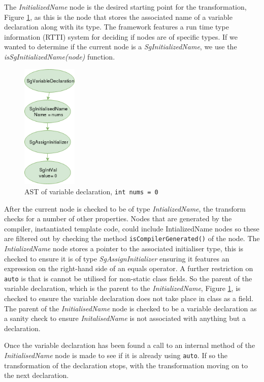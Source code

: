 \documentclass[bsc,frontabs,singlespacing,twoside,parskip,deptreport]{infthesis}
\begin{document}
The \textit{InitializedName} node is the desired starting point for the transformation, Figure \ref{fig:var-dec-ast}, as this is the node that stores the associated name of a variable declaration along with its type. The framework features a run time type information (RTTI) system for deciding if nodes are of specific types. If we wanted to determine if the current node is a \textit{SgInitializedName}, we use the \textit{isSgInitializedName(node)} function.

\begin{figure}[H]
    \centering
    \includegraphics[height=6cm]{images/ast-var-dec.png}
    \caption{AST of variable declaration, \texttt{int nums = 0}}
    \label{fig:var-dec-ast}
\end{figure}

After the current node is checked to be of type \textit{IntializedName}, the transform checks for a number of other properties. Nodes that are generated by the compiler, instantiated template code, could include IntializedName nodes so these are filtered out by checking the method \texttt{isCompilerGenerated()} of the node. The \textit{IntializedName} node stores a pointer to the associated initialiser type, this is checked to ensure it is of type \textit{SgAssignInitializer} ensuring it features an expression on the right-hand side of an equals operator. A further restriction on \texttt{auto} is that is cannot be utilised for non-static class fields. So the parent of the variable declaration, which is the parent to the \textit{InitializedName}, Figure \ref{fig:var-dec-ast}, is checked to ensure the variable declaration does not take place in class as a field. The parent of the \textit{InitialisedName} node is checked to be a variable declaration as a sanity check to ensure \textit{InitalisedName} is not associated with anything but a declaration. 

Once the variable declaration has been found a call to an internal method of the \textit{InitialisedName} node is made to see if it is already using \texttt{auto}. If so the transformation of the declaration stops, with the transformation moving on to the next declaration. 
\end{document}
